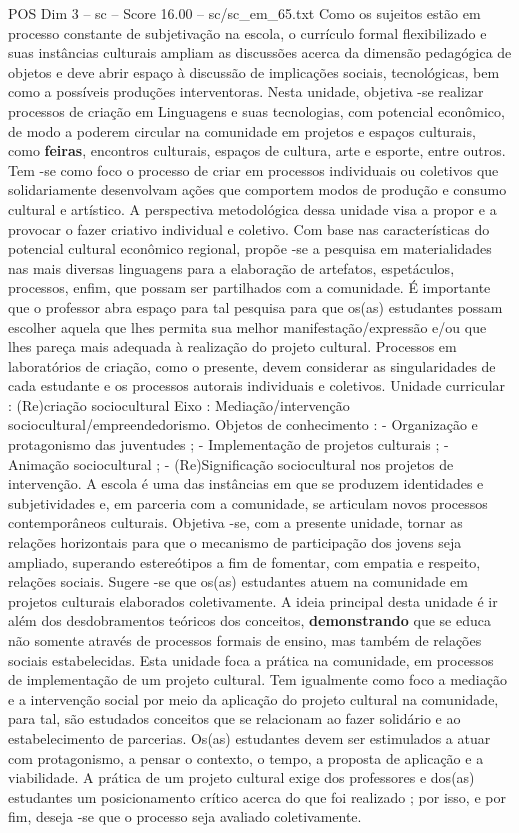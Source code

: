 \begin{textsample}{POS Dim 3 – sc – Score 16.00 – sc/sc\_em\_65.txt}
Como os sujeitos estão em processo constante de subjetivação na escola, o currículo formal flexibilizado e suas instâncias culturais ampliam as discussões acerca da dimensão pedagógica de objetos e deve abrir espaço à discussão de implicações sociais, tecnológicas, bem como a possíveis produções interventoras.
Nesta unidade, objetiva -se realizar processos de criação em Linguagens e suas tecnologias, com potencial econômico, de modo a poderem circular na comunidade em projetos e espaços culturais, como \textbf{feiras}, encontros culturais, espaços de cultura, arte e esporte, entre outros.
Tem -se como foco o processo de criar em processos individuais ou coletivos que solidariamente desenvolvam ações que comportem modos de produção e consumo cultural e artístico.
A perspectiva metodológica dessa unidade visa a propor e a provocar o fazer criativo individual e coletivo.
Com base nas características do potencial cultural econômico regional, propõe -se a pesquisa em materialidades nas mais diversas linguagens para a elaboração de artefatos, espetáculos, processos, enfim, que possam ser partilhados com a comunidade.
É importante que o professor abra espaço para tal pesquisa para que os(as) estudantes possam escolher aquela que lhes permita sua melhor manifestação/expressão e/ou que lhes pareça mais adequada à realização do projeto cultural.
Processos em laboratórios de criação, como o presente, devem considerar as singularidades de cada estudante e os processos autorais individuais e coletivos.
Unidade curricular : (Re)criação sociocultural Eixo : Mediação/intervenção sociocultural/empreendedorismo.
Objetos de conhecimento : - Organização e protagonismo das juventudes ; - Implementação de projetos culturais ; - Animação sociocultural ; - (Re)Significação sociocultural nos projetos de intervenção.
A escola é uma das instâncias em que se produzem identidades e subjetividades e, em parceria com a comunidade, se articulam novos processos contemporâneos culturais.
Objetiva -se, com a presente unidade, tornar as relações horizontais para que o mecanismo de participação dos jovens seja ampliado, superando estereótipos a fim de fomentar, com empatia e respeito, relações sociais.
Sugere -se que os(as) estudantes atuem na comunidade em projetos culturais elaborados coletivamente.
A ideia principal desta unidade é ir além dos desdobramentos teóricos dos conceitos, \textbf{demonstrando} que se educa não somente através de processos formais de ensino, mas também de relações sociais estabelecidas.
Esta unidade foca a prática na comunidade, em processos de implementação de um projeto cultural.
Tem igualmente como foco a mediação e a intervenção social por meio da aplicação do projeto cultural na comunidade, para tal, são estudados conceitos que se relacionam ao fazer solidário e ao estabelecimento de parcerias.
Os(as) estudantes devem ser estimulados a atuar com protagonismo, a pensar o contexto, o tempo, a proposta de aplicação e a viabilidade.
A prática de um projeto cultural exige dos professores e dos(as) estudantes um posicionamento crítico acerca do que foi realizado ; por isso, e por fim, deseja -se que o processo seja avaliado coletivamente.


\end{textsample}
